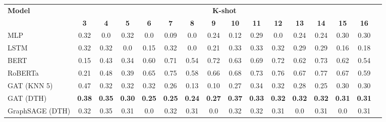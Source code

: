 \documentclass[conference]{IEEEtran}
\begin{document}
\begin{table*}[t]
    \setlength{\tabcolsep}{4pt}
    \centering
    \label{tab:gossipcop_results}
    \begin{tabular}{l|ccccccccccccccc}
    \hline
    \multirow{2}{*}{\textbf{Model}} & \multicolumn{14}{c}{\textbf{K-shot}} \\
    \cline{2-15}
     & \textbf{3} & \textbf{4} & \textbf{5} & \textbf{6} & \textbf{7} & \textbf{8} & \textbf{9} & \textbf{10} & \textbf{11} & \textbf{12} & \textbf{13} & \textbf{14} & \textbf{15} & \textbf{16} \\
    \hline
    MLP & 0.32 & 0.0 & 0.32 & 0.0 & 0.09 & 0.0 & 0.24 & 0.12 & 0.29 & 0.0 & 0.24 & 0.24 & 0.30 & 0.30 \\
    LSTM & 0.32 & 0.32 & 0.0 & 0.15 & 0.32 & 0.0 & 0.21 & 0.33 & 0.33 & 0.32 & 0.29 & 0.29 & 0.16 & 0.18 \\
    BERT & 0.15 & 0.43 & 0.34 & 0.60 & 0.71 & 0.54 & 0.72 & 0.63 & 0.69 & 0.72 & 0.62 & 0.73 & 0.62 & 0.54 \\
    RoBERTa & 0.21 & 0.48 & 0.39 & 0.65 & 0.75 & 0.58 & 0.66 & 0.68 & 0.73 & 0.76 & 0.67 & 0.77 & 0.67 & 0.59 \\
    \hline
    GAT (KNN 5) & 0.47 & 0.32 & 0.32 & 0.32 & 0.26 & 0.13 & 0.10 & 0.27 & 0.34 & 0.32 & 0.28 & 0.25 & 0.30 & 0.30 \\
    GAT (DTH) & \textbf{0.38} & \textbf{0.35} & \textbf{0.30} & \textbf{0.25} & \textbf{0.25} & \textbf{0.24} & \textbf{0.27} & \textbf{0.37} & \textbf{0.33} & \textbf{0.32} & \textbf{0.32} & \textbf{0.32} & \textbf{0.31} & \textbf{0.31} \\
    GraphSAGE (DTH)& 0.32 & 0.35 & 0.31 & 0.0 & 0.32 & 0.31 & 0.0 & 0.32 & 0.32 & 0.31 & 0.0 & 0.31 & 0.0 & 0.31 \\
    \hline
    \end{tabular}
\end{table*}
\end{document}
